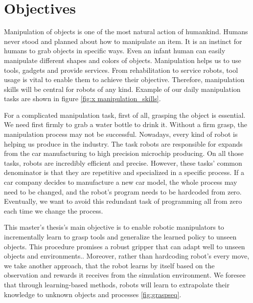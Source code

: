 \section{Objectives}

Manipulation of objects is one of the most natural action of humankind. Humans never stood and planned about how to manipulate an item. It is an instinct for humans to grab objects in specific ways. Even an infant human can easily manipulate different shapes and colors of objects. Manipulation helps us to use tools, gadgets and provide services. From rehabilitation to service robots, tool usage is vital to enable them to achieve their objective.
Therefore, manipulation skills will be central for robots of any kind. 
Example of our daily manipulation tasks are shown in figure \ref{fig:x manipulation_skills}.

For a complicated manipulation task, first of all, grasping the object is essential. We need first firmly to grab a water bottle to drink it.
Without a firm grasp, the manipulation process may not be successful. 
Nowadays, every kind of robot is helping us produce in the industry. The task robots are responsible for expands from the car manufacturing to high precision microchip producing. On all those tasks, robots are incredibly efficient and precise. However, these tasks' common denominator is that they are repetitive and specialized in a specific process. If a car company decides to manufacture a new car model, the whole process may need to be changed, and the robot's program needs to be hardcoded from zero. Eventually, we want to avoid this redundant task of programming all from zero each time we change the process.

This master's thesis's main objective is to enable robotic 
manipulators to incrementally learn to grasp tools and generalize the learned policy to unseen objects. This procedure promises a robust gripper that can adapt well to unseen objects and environments.. Moreover, rather than hardcoding robot's every move, we take another approach, that the robot learns by itself based on the observation and rewards it receives from the simulation environment. We foresee that through learning-based methods, robots will learn to extrapolate their knowledge to unknown objects and processes \ref{fig:graspseq}.

